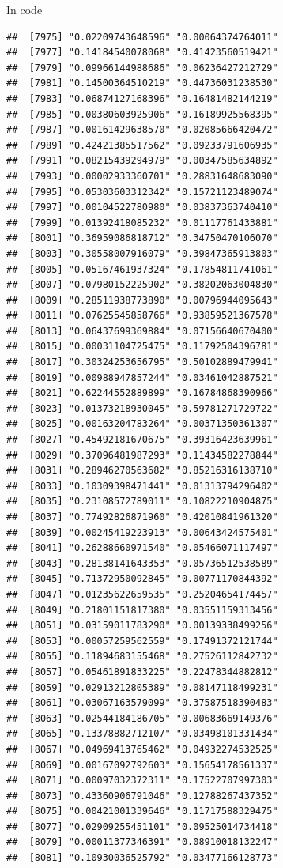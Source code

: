 \documentclass[ignorenonframetext,]{beamer}
\begin{document}
\begin{frame}[fragile]{In code}
\begin{verbatim}
##  [7975] "0.02209743648596" "0.00064374764011"
##  [7977] "0.14184540078068" "0.41423560519421"
##  [7979] "0.09966144988686" "0.06236427212729"
##  [7981] "0.14500364510219" "0.44736031238530"
##  [7983] "0.06874127168396" "0.16481482144219"
##  [7985] "0.00380603925906" "0.16189925568395"
##  [7987] "0.00161429638570" "0.02085666420472"
##  [7989] "0.42421385517562" "0.09233791606935"
##  [7991] "0.08215439294979" "0.00347585634892"
##  [7993] "0.00002933360701" "0.28831648683090"
##  [7995] "0.05303603312342" "0.15721123489074"
##  [7997] "0.00104522780980" "0.03837363740410"
##  [7999] "0.01392418085232" "0.01117761433881"
##  [8001] "0.36959086818712" "0.34750470106070"
##  [8003] "0.30558007916079" "0.39847365913803"
##  [8005] "0.05167461937324" "0.17854811741061"
##  [8007] "0.07980152225902" "0.38202063004830"
##  [8009] "0.28511938773890" "0.00796944095643"
##  [8011] "0.07625545858766" "0.93859521367578"
##  [8013] "0.06437699369884" "0.07156640670400"
##  [8015] "0.00031104725475" "0.11792504396781"
##  [8017] "0.30324253656795" "0.50102889479941"
##  [8019] "0.00988947857244" "0.03461042887521"
##  [8021] "0.62244552889899" "0.16784868390966"
##  [8023] "0.01373218930045" "0.59781271729722"
##  [8025] "0.00163204783264" "0.00371350361307"
##  [8027] "0.45492181670675" "0.39316423639961"
##  [8029] "0.37096481987293" "0.11434582278844"
##  [8031] "0.28946270563682" "0.85216316138710"
##  [8033] "0.10309398471441" "0.01313794296402"
##  [8035] "0.23108572789011" "0.10822210904875"
##  [8037] "0.77492826871960" "0.42010841961320"
##  [8039] "0.00245419223913" "0.00643424575401"
##  [8041] "0.26288660971540" "0.05466071117497"
##  [8043] "0.28138141643353" "0.05736512538589"
##  [8045] "0.71372950092845" "0.00771170844392"
##  [8047] "0.01235622659535" "0.25204654174457"
##  [8049] "0.21801151817380" "0.03551159313456"
##  [8051] "0.03159011783290" "0.00139338499256"
##  [8053] "0.00057259562559" "0.17491372121744"
##  [8055] "0.11894683155468" "0.27526112842732"
##  [8057] "0.05461891833225" "0.22478344882812"
##  [8059] "0.02913212805389" "0.08147118499231"
##  [8061] "0.03067163579099" "0.37587518390483"
##  [8063] "0.02544184186705" "0.00683669149376"
##  [8065] "0.13378882712107" "0.03498101331434"
##  [8067] "0.04969413765462" "0.04932274532525"
##  [8069] "0.00167092792603" "0.15654178561337"
##  [8071] "0.00097032372311" "0.17522707997303"
##  [8073] "0.43360906791046" "0.12788267437352"
##  [8075] "0.00421001339646" "0.11717588329475"
##  [8077] "0.02909255451101" "0.09525014734418"
##  [8079] "0.00011377346391" "0.08910018132247"
##  [8081] "0.10930036525792" "0.03477166128773"

\end{verbatim}
\end{frame}
\end{document}
